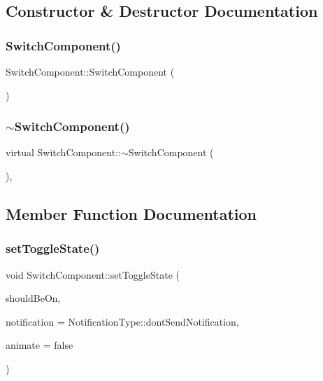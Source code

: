 \subsection{Constructor \& Destructor Documentation}
\mbox{\label{classSwitchComponent_a5d01699ad877451e51da9875ebb3bd17}} 
\subsubsection{\texorpdfstring{Switch\+Component()}{SwitchComponent()}}
{\footnotesize\ttfamily Switch\+Component\+::\+Switch\+Component (\begin{DoxyParamCaption}{ }\end{DoxyParamCaption})}

\mbox{\label{classSwitchComponent_ad8969a140f71dc9d31703d29d4ad79a3}} 
\subsubsection{\texorpdfstring{$\sim$\+Switch\+Component()}{~SwitchComponent()}}
{\footnotesize\ttfamily virtual Switch\+Component\+::$\sim$\+Switch\+Component (\begin{DoxyParamCaption}{ }\end{DoxyParamCaption})\hspace{0.3cm}{\ttfamily [inline]}, {\ttfamily [virtual]}}



\subsection{Member Function Documentation}
\mbox{\label{classSwitchComponent_a61613078c9c4215a806563ed447d3f67}} 
\subsubsection{\texorpdfstring{set\+Toggle\+State()}{setToggleState()}}
{\footnotesize\ttfamily void Switch\+Component\+::set\+Toggle\+State (\begin{DoxyParamCaption}\item[{bool}]{should\+Be\+On,  }\item[{Notification\+Type}]{notification = {\ttfamily NotificationType\+:\+:dontSendNotification},  }\item[{bool}]{animate = {\ttfamily false} }\end{DoxyParamCaption})}

